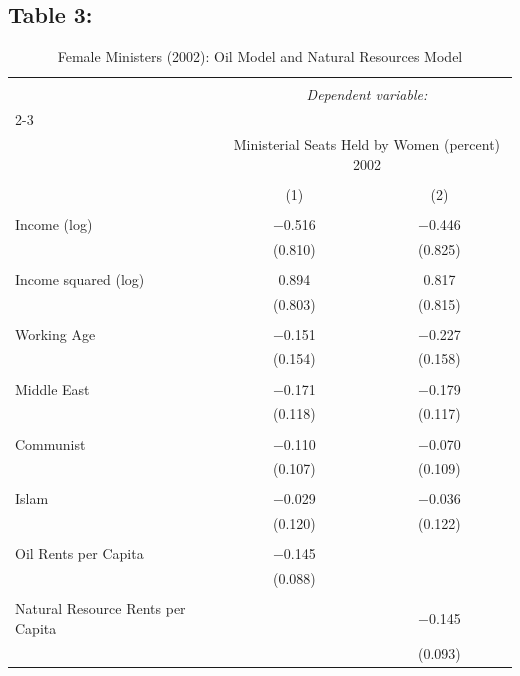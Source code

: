 \documentclass[12pt,letterpaper]{article}
\begin{document}
\newpage
\subsection*{Table 3:}


\begin{table}[!htbp] \centering 
	\caption*{Female Ministers (2002): Oil Model and Natural Resources Model} 
	\label{} 
	\begin{tabular}{@{\extracolsep{5pt}}lcc} 
		\\[-1.8ex]\hline 
		\hline \\[-1.8ex] 
		& \multicolumn{2}{c}{\textit{Dependent variable:}} \\ 
		\cline{2-3} 
		\\[-1.8ex] & \multicolumn{2}{c}{Ministerial Seats Held by Women (percent) 2002} \\ 
		\\[-1.8ex] & (1) & (2)\\ 
		\hline \\[-1.8ex] 
		Income (log) & $-$0.516 & $-$0.446 \\ 
		& (0.810) & (0.825) \\ 
		& & \\ 
		Income squared (log) & 0.894 & 0.817 \\ 
		& (0.803) & (0.815) \\ 
		& & \\ 
		Working Age & $-$0.151 & $-$0.227 \\ 
		& (0.154) & (0.158) \\ 
		& & \\ 
		Middle East & $-$0.171 & $-$0.179 \\ 
		& (0.118) & (0.117) \\ 
		& & \\ 
		Communist & $-$0.110 & $-$0.070 \\ 
		& (0.107) & (0.109) \\ 
		& & \\ 
		Islam & $-$0.029 & $-$0.036 \\ 
		& (0.120) & (0.122) \\ 
		& & \\ 
		Oil Rents per Capita & $-$0.145 &  \\ 
		& (0.088) &  \\ 
		& & \\ 
		Natural Resource Rents per Capita &  & $-$0.145 \\ 
		&  & (0.093) \\ 

\end{tabular}
\end{table}
\end{document}
